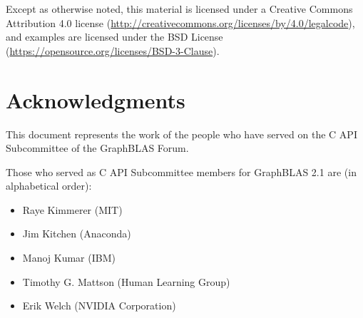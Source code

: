 \documentclass[11pt]{extbook}
\begin{document}


\vspace{1.5cm}



Except as otherwise noted, this material is licensed under a Creative Commons Attribution 4.0 license (\href{http://creativecommons.org/licenses/by/4.0/legalcode}{http://creativecommons.org/licenses/by/4.0/legalcode}), 
and examples are licensed under the BSD License (\href{https://opensource.org/licenses/BSD-3-Clause}{https://opensource.org/licenses/BSD-3-Clause}).


\vfill

\pagebreak
\tableofcontents
\vfill
\pagebreak


{}
\listoftables
\vfill
\newpage

{}
\listoffigures
\vfill
\newpage


{}
\section*{Acknowledgments}

This document represents the work of the people who have served on the C API
Subcommittee of the GraphBLAS Forum.

Those who served as C API Subcommittee members for GraphBLAS 2.1 are (in alphabetical order):
\begin{itemize}
\item Raye Kimmerer (MIT)
\item Jim Kitchen (Anaconda)
\item Manoj Kumar (IBM)   %
\item Timothy G. Mattson (Human Learning Group)
\item Erik Welch (NVIDIA Corporation)
\end{itemize}
\end{document}
